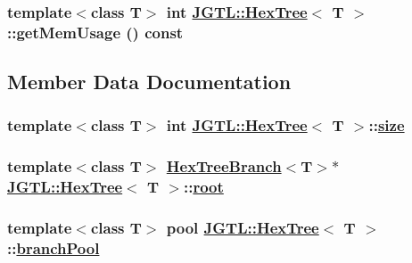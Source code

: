 \hypertarget{class_j_g_t_l_1_1_hex_tree_e1db8278c26cac15bead7197c9e6d76c}{
\subsubsection[getMemUsage]{\setlength{\rightskip}{0pt plus 5cm}template$<$class T$>$ int \hyperlink{class_j_g_t_l_1_1_hex_tree}{JGTL::Hex\-Tree}$<$ T $>$::get\-Mem\-Usage () const}}
\label{class_j_g_t_l_1_1_hex_tree_e1db8278c26cac15bead7197c9e6d76c}




\subsection{Member Data Documentation}
\hypertarget{class_j_g_t_l_1_1_hex_tree_6b9ceceeccc164dde96f9f4e75c62723}{
\subsubsection[size]{\setlength{\rightskip}{0pt plus 5cm}template$<$class T$>$ int \hyperlink{class_j_g_t_l_1_1_hex_tree}{JGTL::Hex\-Tree}$<$ T $>$::\hyperlink{class_j_g_t_l_1_1_hex_tree_6b9ceceeccc164dde96f9f4e75c62723}{size}}}
\label{class_j_g_t_l_1_1_hex_tree_6b9ceceeccc164dde96f9f4e75c62723}


\hypertarget{class_j_g_t_l_1_1_hex_tree_5b04bc2334f5d662959cbaf5b57ba71e}{
\subsubsection[root]{\setlength{\rightskip}{0pt plus 5cm}template$<$class T$>$ \hyperlink{class_j_g_t_l_1_1_hex_tree_branch}{Hex\-Tree\-Branch}$<$T$>$$\ast$ \hyperlink{class_j_g_t_l_1_1_hex_tree}{JGTL::Hex\-Tree}$<$ T $>$::\hyperlink{class_j_g_t_l_1_1_hex_tree_5b04bc2334f5d662959cbaf5b57ba71e}{root}}}
\label{class_j_g_t_l_1_1_hex_tree_5b04bc2334f5d662959cbaf5b57ba71e}


\hypertarget{class_j_g_t_l_1_1_hex_tree_0491463e043431f5a10b5cffc1eabdf3}{
\subsubsection[branchPool]{\setlength{\rightskip}{0pt plus 5cm}template$<$class T$>$ pool \hyperlink{class_j_g_t_l_1_1_hex_tree}{JGTL::Hex\-Tree}$<$ T $>$::\hyperlink{class_j_g_t_l_1_1_hex_tree_0491463e043431f5a10b5cffc1eabdf3}{branch\-Pool}}}
\label{class_j_g_t_l_1_1_hex_tree_0491463e043431f5a10b5cffc1eabdf3}


